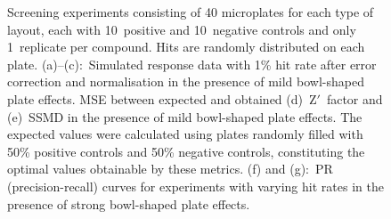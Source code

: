 \begin{figure}[!htb]
  \caption{Screening experiments consisting of 40 microplates for each type of
    layout, each with 10~positive and 10~negative controls and only
    1~replicate per compound. Hits are randomly distributed on each plate.
    (a)--(c):~Simulated response data with 1\% hit rate after error correction
    and normalisation in the presence of mild bowl-shaped plate effects.
    MSE between expected and obtained (d)~Z$'$~factor and (e)~SSMD in the
    presence of mild bowl-shaped plate effects. The expected values were
    calculated using plates randomly filled with 50\% positive controls and
    50\% negative controls, constituting the optimal values obtainable by
    these metrics.
    (f) and (g):~PR (precision-recall) curves for experiments with varying
    hit rates in the presence of strong bowl-shaped plate effects.}
  \label{fig:screening}
\end{figure}


